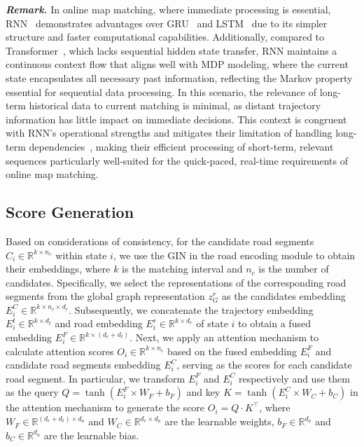 \noindent \textit{\textbf{Remark.}} In online map matching, where immediate processing is essential, RNN~\cite{RNN} demonstrates advantages over GRU~\cite{GRU} and LSTM~\cite{LSTM} due to its simpler structure and faster computational capabilities. Additionally, compared to Transformer~\cite{transformer}, which lacks sequential hidden state transfer, RNN maintains a continuous context flow that aligns well with MDP modeling, where the current state encapsulates all necessary past information, reflecting the Markov property essential for sequential data processing. In this scenario, the relevance of long-term historical data to current matching is minimal, as distant trajectory information has little impact on immediate decisions. This context is congruent with RNN's operational strengths and mitigates their limitation of handling long-term dependencies~\cite{RNNsurvey}, making their efficient processing of short-term, relevant sequences particularly well-suited for the quick-paced, real-time requirements of online map matching.

\subsection{Score Generation}
\label{sec:4.3}
Based on considerations of consistency, for the candidate road segments $C_i \in \mathbb{R}^{k \times n_c}$ within state $i$, we use the GIN in the road encoding module to obtain their embeddings, where $k$ is the matching interval and $n_c$ is the number of candidates. Specifically, we select the representations of the corresponding road segments from the global graph representation $z_G^r$ as the candidates embedding $E_i^C \in \mathbb{R}^{k \times n_c \times d_r}$. Subsequently, we concatenate the trajectory embedding $E_i^t \in \mathbb{R}^{k \times d_t}$ and road embedding $E_i^r \in \mathbb{R}^{k \times d_r}$ of state $i$ to obtain a fused embedding $E_i^F \in \mathbb{R}^{k \times (d_r+d_t)}$.
Next, we apply an attention mechanism to calculate attention scores $O_i \in \mathbb{R}^{k \times n_c}$ based on the fused embedding $E_i^F$ and candidate road segments embedding $E_i^C$, serving as the scores for each candidate road segment. In particular, we transform $E_i^F$ and $E_i^C$ respectively and use them as the query $Q = \tanh(E_i^F \times W_F+ b_F)$ and key $K = \tanh(E_i^C \times W_C + b_C)$ in the attention mechanism to generate the score $O_i = Q \cdot K^\top$, where $W_F \in \mathbb{R}^{(d_r+d_t) \times d_a}$ and $W_C \in \mathbb{R}^{d_r \times d_a}$ are the learnable weights, $b_F \in \mathbb{R}^{d_a}$ and $b_C \in \mathbb{R}^{d_a}$ are the learnable bias.

  
